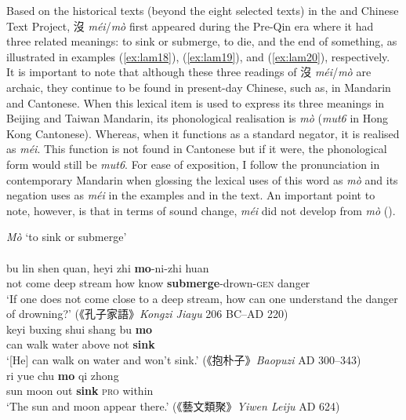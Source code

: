 \documentclass[output=paper,colorlinks,citecolor=brown,chinesefont]{langscibook}
\begin{document}
Based on the historical texts (beyond the eight selected texts) in the \cite{chant} and Chinese Text Project, {\cn 沒} \textit{méi}/\textit{mò} first appeared during the Pre-Qin era where it had three related meanings: to sink or submerge, to die, and the end of something, as illustrated in examples (\ref{ex:lam18}), (\ref{ex:lam19}), and (\ref{ex:lam20}), respectively. It is important to note that although these three readings of {\cn 沒} \textit{méi}/\textit{mò}  are archaic, they continue to be found in present-day Chinese, such as, in Mandarin and Cantonese. When this lexical item is used to express its three meanings in Beijing and Taiwan Mandarin, its phonological realisation is \textit{mò} (\textit{mut6} in Hong Kong Cantonese). Whereas, when it functions as a standard negator, it is realised as \textit{méi}. This function is not found in Cantonese but if it were, the phonological form would still be \textit{mut6}. For ease of exposition, I follow the pronunciation in contemporary Mandarin when glossing the lexical uses of this word as \textit{mò} and its negation uses as \textit{méi} in the examples and in the text. An important point to note, however, is that in terms of sound change, \textit{méi} did not develop from \textit{mò} (\citealt[390]{Schuessler2007}).

\ea \textit{Mò} `to sink or submerge'  \label{ex:lam18}\\
   \label{ex:lam18a}\\
  	\gll bu lin shen quan, heyi zhi \textbf{mo}-ni-zhi huan\\
  	not come	 deep stream how know \textbf{submerge}-drown-\textsc{gen} danger\\ 
  	\glt `If one does not come close to a deep stream, how can one understand the danger of drowning?' ({\cn 《孔子家語》}\emph{Kongzi Jiayu} 206 BC–AD 220)
  \label{ex:lam18b}\\
  	\gll keyi buxing shui shang bu \textbf{mo}\\ 
  	can walk water above not \textbf{sink}\\
  	\glt `[He] can walk on water and won't sink.' ({\cn 《抱朴子》}\emph{Baopuzi} AD 300–343)
   \label{ex:lam18c}\\
	\gll ri yue chu \textbf{mo} qi zhong\\ 
	sun	moon	 out \textbf{sink} \textsc{pro} within\\ 
	\glt `The sun and moon appear there.' ({\cn 《藝文類聚》}\emph{Yiwen Leiju} AD 624)
\z \z 
\end{document}
